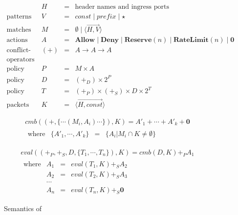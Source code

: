 \begin{figure}

\begin{displaymath}
\begin{array}{lrcl}
& H & = & \textrm{header names and ingress ports} \\
\textrm{patterns} & V & = & \textit{const} \mid \textit{prefix} \mid \star \\
\textrm{matches} & M & = & 
  \emptyset \mid \langle \overrightarrow{H,V} \rangle \\
\textrm{actions} & A & = & \textbf{Allow} \mid \textbf{Deny} 
  \mid \textbf{Reserve}(n) \mid \textbf{RateLimit}(n) \mid \textbf{0} \\
\textrm{conflict-resolution} & (+)  & = & A \rightarrow A \rightarrow A \\
\textrm{operators} \\
\textrm{policy atoms} & P & = & M \times A \\
\textrm{policy tree nodes} & D & = & (+_D) \times 2^P \\
\textrm{policy trees} & T & = & (+_P) \times (+_S) \times D \times 2^{T} \\
\textrm{packets} & K & = & \langle \overrightarrow{H,\mathit{const}} \rangle
\end{array}
\end{displaymath}

\begin{displaymath}
\begin{array}{l}
\mathit{cmb}((+,\{ \cdots (M_i,A_i) \cdots \}), K) = 
  A'_1 + \cdots + A'_k + \textbf{0} \\
\begin{array}{lrcl}
\textrm{where} & \{ A'_1, \cdots, A'_k \} & = & \{ A_i | M_i \cap K \ne \emptyset \}
\end{array}
\end{array}
\end{displaymath}

\begin{displaymath}
\begin{array}{l}
\textit{eval}((+_P,+_S,D,\{ T_1,\cdots, T_n \}), K) = \textit{cmb}(D, K) +_P A_1 \\
\begin{array}{lrcl}
\textrm{where}
& A_1 & = & eval(T_1,K) +_S A_2 \\
& A_2 & = & eval(T_2,K) +_S A_3 \\
& \cdots \\
& A_n & = & eval(T_n,K) +_S \textbf{0}
\end{array}
\end{array}
\end{displaymath}

\caption[Caption for Semantics]{Semantics of \treelang \footnotemark }
\label{f:sharesem}
\end{figure}


